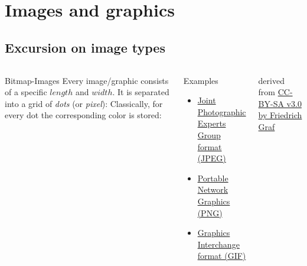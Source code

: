 \section{Images and graphics}

\subsection{Excursion on image types}
%		

\begin{frame}
	\begin{columns}[onlytextwidth]
		\begin{block}{Bitmap-Images}
			Every image/graphic consists of a specific $length$ and $width$. It is
			separated into a grid of \emph{dots} (or \emph{pixel}):
			Classically, for every dot the corresponding color is stored:
		\end{block}
			
		\begin{exampleblock}{Examples}
			\begin{itemize}
				\item \href{http://de.wikipedia.org/wiki/JPEG}{Joint
					Photographic Experts Group format (JPEG)}
				\item \href{http://de.wikipedia.org/wiki/Portable_Network_Graphics}{Portable Network
					Graphics (PNG)}
				\item \href{http://de.wikipedia.org/wiki/GIF}{Graphics
					Interchange format (GIF)}
			\end{itemize}
		\end{exampleblock}
		{\centering{}}

		{\tiny derived from \href{http://commons.wikimedia.org/wiki/File:Aufloesung\_erklaert.svg}{CC-BY-SA
		v3.0 by Friedrich Graf}}
	\end{columns}
\end{frame}

